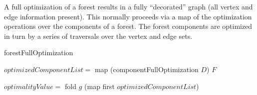 \documentclass[11pt]{article}
\begin{document}
A full optimization of a forest results in a fully ``decorated'' graph (all vertex and edge information present).
This normally proceeds via a map of the optimization operations over the components of a forest.
The forest components are optimized in turn by a series of traversals over the vertex and edge sets.
 
%

	\begin{algorithm}
		\caption{forestFullOptimization}
		\label{alg:orestFullOpt}
		\SetAlgoLined
		$optimizedComponentList =$ map (componentFullOptimization $D$) $F$
		
		$optimalityValue =$ fold $g$ (map first $optimizedComponentList$)
		
	\end{algorithm}
	
\end{document}

